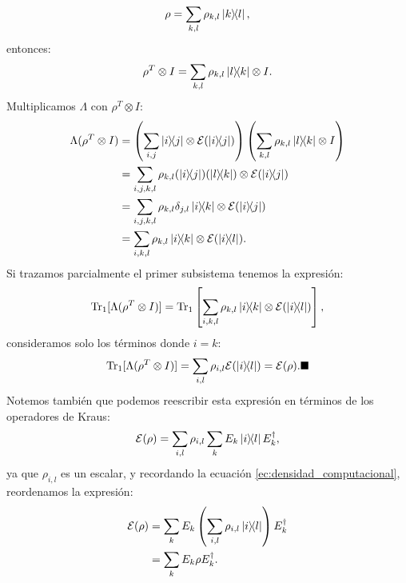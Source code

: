 \documentclass[letterpaper,12pt]{thesisECFM}
\theoremstyle{plain}
\theoremstyle{definition}
\theoremstyle{definition}
\theoremstyle{remark}
\newcommand{\1}{\mathbb{1}}
\begin{document}
\begin{enumerate}
\begin{equation}
            \rho = \sum_{k,l} \rho_{k,l} \ketbra{k}{l},
        \end{equation}
        entonces:
        \begin{equation}
            \rho^{T} \otimes I = \sum_{k,l} \rho_{k,l} \ketbra{l}{k} \otimes I.
        \end{equation}
        Multiplicamos $\Lambda$ con $\rho^{T} \otimes I$:
        \begin{align}
            \Lambda(\rho^{T} \otimes I) & = \left( \sum_{i,j} \ketbra{i}{j} \otimes \mathcal{E}(\ketbra{i}{j}) \right) \left( \sum_{k,l} \rho_{k,l} \ketbra{l}{k} \otimes I \right) \\
            & = \sum_{i,j,k,l} \rho_{k,l} (  \ketbra{i}{j} ) (\ketbra{l}{k}) \otimes \mathcal{E} (\ketbra{i}{j})\\
            & =  \sum_{i,j,k,l} \rho_{k,l} \delta_{j,l} \ketbra{i}{k} \otimes \mathcal{E}( \ketbra{i}{j})\\
            & = \sum_{i,k,l} \rho_{k,l} \ketbra{i}{k} \otimes \mathcal{E}( \ketbra{i}{l}).
        \end{align}
        Si trazamos parcialmente el primer subsistema tenemos la expresión: 
        \begin{equation}
            \text{Tr}_1 [ \Lambda ( \rho^{T} \otimes I)]  = \text{Tr}_1 \left[  \sum_{i,k,l} \rho_{k,l}\ketbra{i}{k} \otimes \mathcal{E}(\ketbra{i}{l})\right],
        \end{equation}
        consideramos solo los términos donde $i=k$:
        \begin{equation}
            \text{Tr}_1 [ \Lambda ( \rho^{T} \otimes I)]  = \sum_{i,l}\rho_{i,l} \mathcal{E}(\ketbra{i}{l}) = \mathcal{E}(\rho) .\blacksquare
        \end{equation}
        Notemos también  que podemos reescribir esta expresión en términos de los operadores de Kraus:
        \begin{equation}
            \mathcal{E}(\rho) = \sum_{i,l} \rho_{i,l} \sum_k E_k \ketbra{i}{l}E_k^{\dagger},
        \end{equation}
        ya que $\rho_{i,l}$ es un escalar, y recordando la ecuación \ref{ec:densidad_computacional}, reordenamos la expresión: 
        \begin{align}
            \mathcal{E}(\rho)& = \sum_k E_k \left( \sum_{i,l}\rho_{i,l}\ketbra{i}{l}\right) E_k^{\dagger}\\
            & = \sum_k E_k \rho E_k^{\dagger}.
        \end{align}



\end{enumerate}
\end{document}
